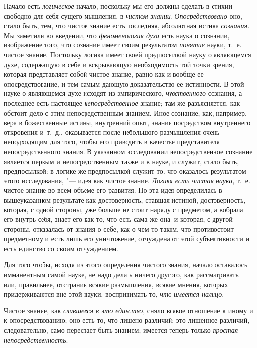 Начало есть {\em логическое} начало, поскольку мы его
должны сделать в стихии свободно для себя сущего мышления, в
{\em чистом знании}. {\em Опосредствовано} оно, стало быть, тем, что чистое
знание есть последняя, абсолютная истина
{\em сознания}. Мы заметили во введении, что
{\em феноменология духа} есть наука о сознании,
изображение того, что сознание имеет своим результатом
{\em понятие} науки, т.~е. чистое знание. Постольку
логика имеет своей предпосылкой науку о являющемся духе, содержащую в себе
и вскрывающую необходимость той точки зрения, которая представляет собой
чистое знание, равно как и вообще ее опосредствование, и тем самым дающую
доказательство ее истинности. В этой науке о являющемся духе исходят из
эмпирического, {\em чувственного} сознания, а последнее
есть настоящее {\em непосредственное} знание; там же
разъясняется, как обстоит дело с этим непосредственным знанием. Иное
сознание, как, например, вера в божественные истины, внутренний опыт,
знание посредством внутреннего откровения и~т.~д., оказывается после
небольшого размышления очень неподходящим для того, чтобы его приводить в
качестве представителя непосредственного знания. В указанном исследовании
непосредственное сознание является первым и непосредственным также и в
науке, и служит, стало быть, предпосылкой; в логике же предпосылкой служит
то, что оказалось результатом этого исследования, "--- идея как чистое знание.
{\em Логика есть чистая наука}, т.~е. чистое знание во
всем объеме его развития. Но эта идея определилась в вышеуказанном
результате как достоверность, ставшая истиной, достоверность, которая, с
одной стороны, уже больше не стоит наряду с предметом, а вобрала его внутрь
себя, знает его как то, что есть сама же она, и которая, с другой стороны,
отказалась от знания о себе, как о чем-то таком, что противостоит
предметному и есть лишь его уничтожение, отчуждена от этой субъективности и
есть единство со своим отчуждением.

Для того чтобы, исходя из этого определения чистого знания, начало
оставалось имманентным самой науке, не надо делать ничего другого, как
рассматривать или, правильнее, отстранив всякие размышления, всякие мнения,
которых придерживаются вне этой науки, воспринимать то,
{\em что имеется налицо}.

Чистое знание, как {\em слившееся в это единство}, сняло
всякое отношение к иному и к опосредствованию; оно есть то, что лишено
различий; это лишенное различий, следовательно, само перестает быть
знанием; имеется теперь только {\em простая
непосредственность}.

